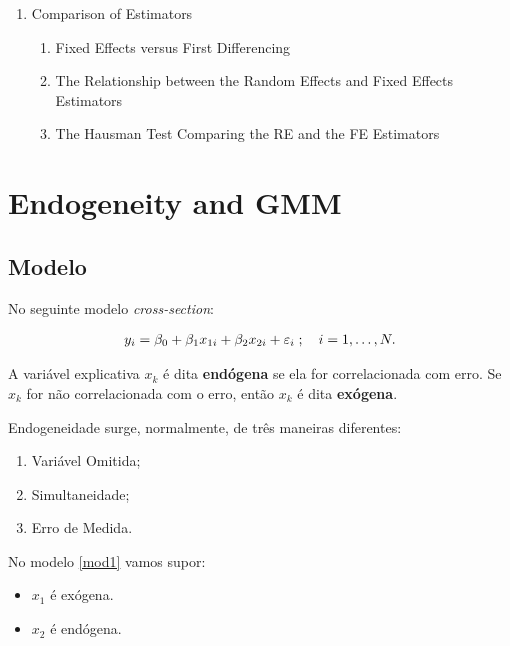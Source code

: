 \documentclass[11pt, oneside, a4paper, article]{article}
\numberwithin{equation}{section}
\begin{document}
\begin{enumerate}[noitemsep, label*=10.\arabic*.]
\item Comparison of Estimators
\begin{enumerate}[noitemsep, leftmargin=1 em, label*=\arabic*.]
\item Fixed Effects versus First Differencing
\item The Relationship between the Random Effects and Fixed Effects Estimators
\item The Hausman Test Comparing the RE and the FE Estimators
\end{enumerate}
\end{enumerate}



\clearpage
\section{Endogeneity and GMM}


\subsection*{Modelo}

No seguinte modelo \textit{cross-section}:

\vspace{-1 em}
\begin{align} \label{mod1}
	y_{i} = \beta_{0} + \beta_{1} x_{1i} + \beta_{2} x_{2i} + \varepsilon_{i}
	\; ; \quad i = 1, \dots, N.
\end{align}

\noindent
A variável explicativa $x_{k}$ é dita \textbf{endógena} se ela for correlacionada com erro.
Se $x_{k}$ for não correlacionada com o erro, então $x_{k}$ é dita \textbf{exógena}.

Endogeneidade surge, normalmente, de três maneiras diferentes:

\begin{enumerate}\itemsep0pt
	\item Variável Omitida;
	\item Simultaneidade;
	\item Erro de Medida.
\end{enumerate}

No modelo \eqref{mod1} vamos supor:

\begin{itemize}\itemsep0pt
	\item $x_{1}$ é exógena.
	\item $x_{2}$ é endógena.
\end{itemize}
\end{document}
